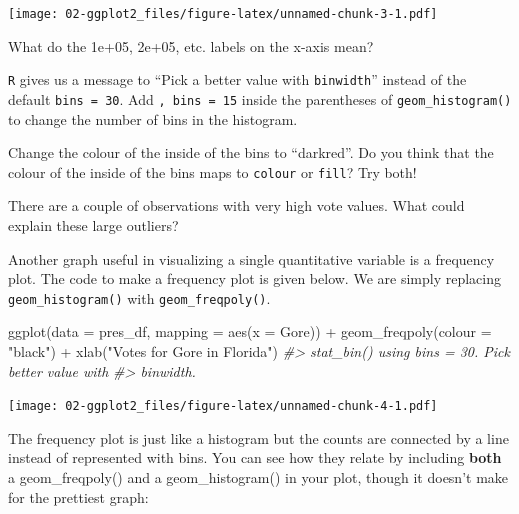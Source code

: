 \documentclass[
]{book}
\newenvironment{Shaded}{\begin{snugshade}}{\end{snugshade}}
\newcommand{\AttributeTok}[1]{\textcolor[rgb]{0.77,0.63,0.00}{#1}}
\newcommand{\CommentTok}[1]{\textcolor[rgb]{0.56,0.35,0.01}{\textit{#1}}}
\newcommand{\FunctionTok}[1]{\textcolor[rgb]{0.00,0.00,0.00}{#1}}
\newcommand{\NormalTok}[1]{#1}
\newcommand{\SpecialCharTok}[1]{\textcolor[rgb]{0.00,0.00,0.00}{#1}}
\newcommand{\StringTok}[1]{\textcolor[rgb]{0.31,0.60,0.02}{#1}}
\begin{document}
\texttt{[image: 02-ggplot2\_files/figure-latex/unnamed-chunk-3-1.pdf]}

What do the 1e+05, 2e+05, etc. labels on the x-axis mean?

\texttt{R} gives us a message to ``Pick a better value with \texttt{binwidth}'' instead of the default \texttt{bins\ =\ 30}. Add \texttt{,\ bins\ =\ 15} inside the parentheses of \texttt{geom\_histogram()} to change the number of bins in the histogram.

Change the colour of the inside of the bins to ``darkred''. Do you think that the colour of the inside of the bins maps to \texttt{colour} or \texttt{fill}? Try both!

There are a couple of observations with very high vote values. What could explain these large outliers?

Another graph useful in visualizing a single quantitative variable is a frequency plot. The code to make a frequency plot is given below. We are simply replacing \texttt{geom\_histogram()} with \texttt{geom\_freqpoly()}.

\begin{Shaded}
\begin{Highlighting}[]
\FunctionTok{ggplot}\NormalTok{(}\AttributeTok{data =}\NormalTok{ pres\_df, }\AttributeTok{mapping =} \FunctionTok{aes}\NormalTok{(}\AttributeTok{x =}\NormalTok{ Gore)) }\SpecialCharTok{+}
  \FunctionTok{geom\_freqpoly}\NormalTok{(}\AttributeTok{colour =} \StringTok{"black"}\NormalTok{) }\SpecialCharTok{+}
  \FunctionTok{xlab}\NormalTok{(}\StringTok{"Votes for Gore in Florida"}\NormalTok{) }
\CommentTok{\#\textgreater{} \textasciigrave{}stat\_bin()\textasciigrave{} using \textasciigrave{}bins = 30\textasciigrave{}. Pick better value with}
\CommentTok{\#\textgreater{} \textasciigrave{}binwidth\textasciigrave{}.}
\end{Highlighting}
\end{Shaded}

\texttt{[image: 02-ggplot2\_files/figure-latex/unnamed-chunk-4-1.pdf]}

The frequency plot is just like a histogram but the counts are connected by a line instead of represented with bins. You can see how they relate by including \textbf{both} a geom\_freqpoly() and a geom\_histogram() in your plot, though it doesn't make for the prettiest graph:
\end{document}
